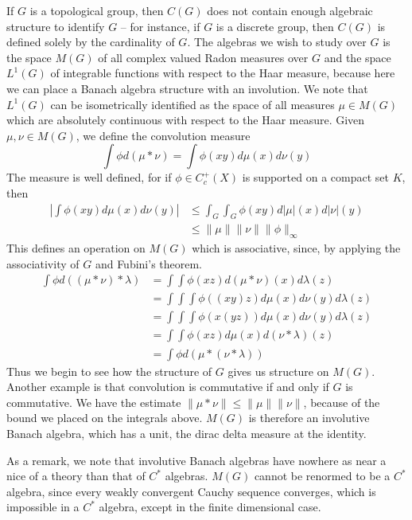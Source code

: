 If $G$ is a topological group, then $C(G)$ does not contain enough algebraic structure to identify $G$ -- for instance, if $G$ is a discrete group, then $C(G)$ is defined solely by the cardinality of $G$. The algebras we wish to study over $G$ is the space $M(G)$ of all complex valued Radon measures over $G$ and the space $L^1(G)$ of integrable functions with respect to the Haar measure, because here we can place a Banach algebra structure with an involution. We note that $L^1(G)$ can be isometrically identified as the space of all measures $\mu \in M(G)$ which are absolutely continuous with respect to the Haar measure. Given $\mu, \nu \in M(G)$, we define the convolution measure
%
\[ \int \phi d(\mu * \nu) = \int \phi(xy) d\mu(x) d\nu(y) \]
%
The measure is well defined, for if $\phi \in C_c^+(X)$ is supported on a compact set $K$, then
%
\begin{align*}
    \left| \int \phi(xy) d\mu(x) d\nu(y) \right| &\leq \int_G \int_G \phi(xy) d|\mu|(x) d|\nu|(y)\\
    &\leq \| \mu \| \| \nu \| \| \phi \|_\infty
\end{align*}
%
This defines an operation on $M(G)$ which is associative, since, by applying the associativity of $G$ and Fubini's theorem.
%
\begin{align*}
    \int \phi d((\mu * \nu) * \lambda) &= \int \int \phi(xz) d(\mu * \nu)(x) d\lambda(z)\\
    &= \int \int \int \phi((xy)z) d\mu(x) d\nu(y) d\lambda(z)\\
    &= \int \int \int \phi(x(yz)) d\mu(x) d\nu(y) d\lambda(z)\\
    &= \int \int \phi(xz) d\mu(x) d(\nu * \lambda)(z)\\
    &= \int \phi d(\mu * (\nu * \lambda))
\end{align*}
%
Thus we begin to see how the structure of $G$ gives us structure on $M(G)$. Another example is that convolution is commutative if and only if $G$ is commutative. We have the estimate $\| \mu * \nu \| \leq \| \mu \| \| \nu \|$, because of the bound we placed on the integrals above. $M(G)$ is therefore an involutive Banach algebra, which has a unit, the dirac delta measure at the identity.

As a remark, we note that involutive Banach algebras have nowhere as near a nice of a theory than that of $C^*$ algebras. $M(G)$ cannot be renormed to be a $C^*$ algebra, since every weakly convergent Cauchy sequence converges, which is impossible in a $C^*$ algebra, except in the finite dimensional case.

